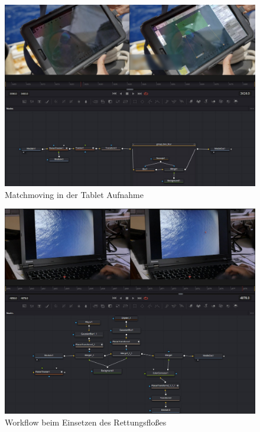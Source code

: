 \begin{figure}[H]
\begin{center}
\includegraphics[width=1\textwidth]{gfx/post/resolve8.jpg}
\caption{Matchmoving in der Tablet Aufnahme}
\label{resolve8}
\end{center}
\end{figure}

\begin{figure}[H]
\begin{center}
\includegraphics[width=1\textwidth]{gfx/post/resolve5.jpg}
\caption{Workflow beim Einsetzen des Rettungsfloßes}
\label{resolve10}
\end{center}
\end{figure}

